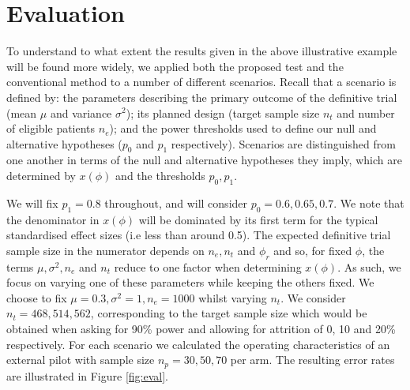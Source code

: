 \documentclass[AMA,STIX1COL]{WileyNJD-v2}
\begin{document}
\section{Evaluation}\label{sec:eval}

To understand to what extent the results given in the above illustrative example will be found more widely, we applied both the proposed test and the conventional method to a number of different scenarios. Recall that a scenario is defined by: the parameters describing the primary outcome of the definitive trial (mean $\mu$ and variance $\sigma^2$); its planned design (target sample size $n_t$ and number of eligible patients $n_e$); and the power thresholds used to define our null and alternative hypotheses ($p_0$ and $p_1$ respectively). Scenarios are distinguished from one another in terms of the null and alternative hypotheses they imply, which are determined by $x(\phi)$ and the thresholds $p_0, p_1$. 

We will fix $p_1 = 0.8$ throughout, and will consider $p_0 = 0.6, 0.65, 0.7$. We note that the denominator in $x(\phi)$ will be dominated by its first term for the typical standardised effect sizes (i.e less than around 0.5). The expected definitive trial sample size in the numerator depends on $n_e, n_t$ and $\phi_r$ and so, for fixed $\phi$, the terms $\mu, \sigma^2, n_e$ and $n_t$ reduce to one factor when determining $x(\phi)$. As such, we focus on varying one of these parameters while keeping the others fixed. We choose to fix $\mu = 0.3, \sigma^2 = 1, n_e = 1000$ whilst varying $n_t$. We consider $n_t =  468, 514, 562$, corresponding to the target sample size which would be obtained when asking for 90\% power and allowing for attrition of 0, 10 and 20\% respectively. For each scenario we calculated the operating characteristics of an external pilot with sample size $n_p = 30, 50, 70$ per arm. The resulting error rates are illustrated in Figure \ref{fig:eval}.
\end{document}

